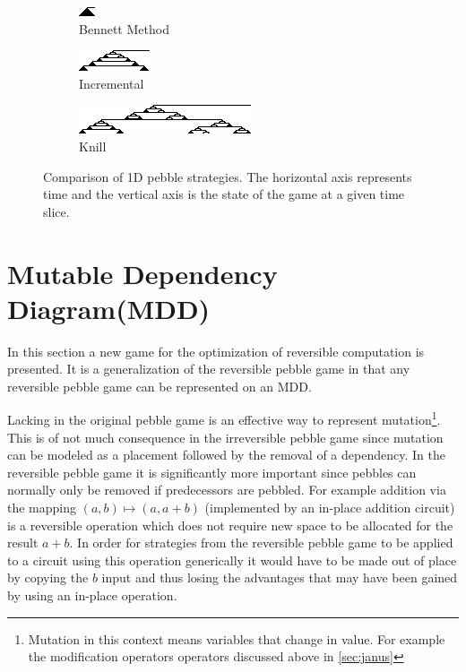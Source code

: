 

\begin{figure}
  \centering
  \begin{subfigure}{0.3\textwidth}
    \centering
    \includegraphics{images/Pebble1.png}
    \caption{Bennett Method}
  \end{subfigure}
  \begin{subfigure}{0.3\textwidth}
    \centering
    \includegraphics{images/Pebble2.png}
    \caption{Incremental}
  \end{subfigure}\begin{subfigure}{0.3\textwidth}
    \centering
    \includegraphics{images/Pebble3.png}
    \caption{Knill}
  \end{subfigure}
  \label{fig:pebble}
  \caption{Comparison of 1D pebble strategies. The horizontal axis represents
  time and the vertical axis is the state of the game at a given time slice.}
\end{figure}

\section{Mutable Dependency Diagram(MDD)}

In this section a new game for the optimization of reversible computation is
presented. It is a generalization of the reversible pebble game in that any
reversible pebble game can be represented on an MDD. 

Lacking in the original pebble game is an effective way to represent
mutation\footnote{Mutation in this context means variables that change in
value. For example the modification operators operators discussed above in
\cref{sec:janus}}. This is of not much consequence in the irreversible pebble
game since mutation can be modeled as a placement followed by the removal of a
dependency. In the reversible pebble game it is significantly more important
since pebbles can normally only be removed if predecessors are pebbled. For
example addition via the mapping $(a,b) \mapsto (a,a+b)$ (implemented by an
in-place addition circuit) is a reversible operation which does not require new
space to be allocated for the result $a+b$.  In order for strategies from the
reversible pebble game to be applied to a circuit using this operation
generically it would have to be made out of place by copying the $b$ input and
thus losing the advantages that may have been gained by using an in-place
operation.

